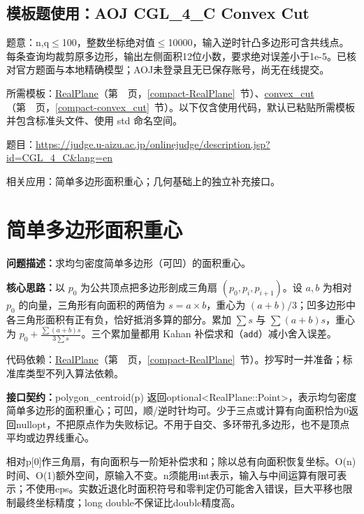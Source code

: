 

\newpage

\Needspace{485pt}

\subsection*{模板题使用：AOJ CGL\_4\_C Convex Cut}

\label{usage-example-419}

题意：n,q$\le$100，整数坐标绝对值$\le$10000，输入逆时针凸多边形可含共线点。每条查询均裁剪原多边形，输出左侧面积12位小数，要求绝对误差小于1e-5。已核对官方题面与本地精确模型；AOJ未登录且无已保存账号，尚无在线提交。

所需模板：\hyperref[compact-RealPlane]{RealPlane}（第~\pageref{compact-RealPlane}~页，\ref{compact-RealPlane}~节）、\hyperref[compact-convex_cut]{convex\_\allowbreak{}cut}（第~\pageref{compact-convex_cut}~页，\ref{compact-convex_cut}~节）。以下仅含使用代码，默认已粘贴所需模板并包含标准头文件、使用 std 命名空间。

题目：\url{https://judge.u-aizu.ac.jp/onlinejudge/description.jsp?id=CGL_4_C&lang=en}



\newpage

\Needspace{512pt}

\noindent 相关应用：简单多边形面积重心；几何基础上的独立补充接口。

\section{简单多边形面积重心}\label{compact-polygon_centroid}

\noindent\textbf{问题描述：}\allowbreak 求均匀密度简单多边形（可凹）的面积重心。

\textbf{核心思路：}\allowbreak 以 $p_0$ 为公共顶点把多边形剖成三角扇 $(p_0,p_i,p_{i+1})$。设 $a,b$ 为相对 $p_0$ 的向量，三角形有向面积的两倍为 $s=a\times b$，重心为 $(a+b)/3$；凹多边形中各三角形面积有正有负，恰好抵消多算的部分。累加 $\sum s$ 与 $\sum(a+b)s$，重心为 $p_0+\frac{\sum(a+b)s}{3\sum s}$。三个累加量都用 Kahan 补偿求和（\texttt{add}）减小舍入误差。

代码依赖：\hyperref[compact-RealPlane]{RealPlane}（第~\pageref{compact-RealPlane}~页，\ref{compact-RealPlane}~节）。抄写时一并准备；标准库类型不列入算法依赖。

{\sloppy{}\noindent\textbf{接口契约：}polygon\_centroid(p) 返回optional<RealPlane::Point>，表示均匀密度简单多边形的面积重心；可凹，顺/逆时针均可。少于三点或计算有向面积恰为0返回nullopt，不把原点作为失败标记。不用于自交、多环带孔多边形，也不是顶点平均或边界线重心。

相对p[0]作三角扇，有向面积与一阶矩补偿求和；除以总有向面积恢复坐标。O(n)时间、O(1)额外空间，原输入不变。n须能用int表示，输入与中间运算有限可表示；不使用eps。实数近退化时面积符号和零判定仍可能舍入错误，巨大平移也限制最终坐标精度；long double不保证比double精度高。\par}

